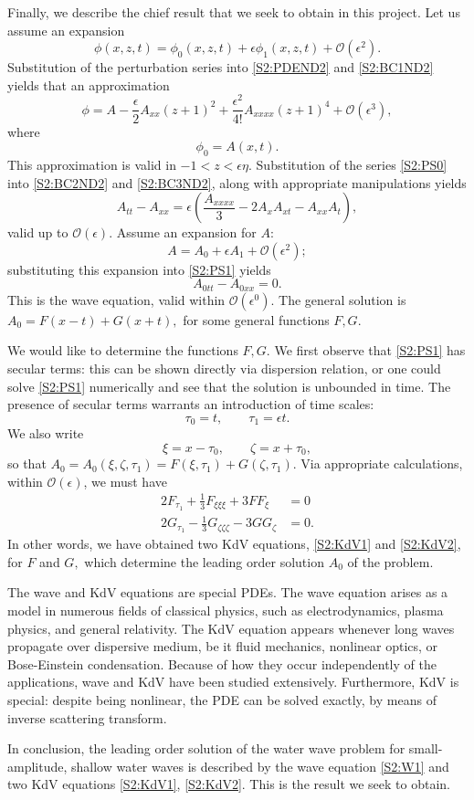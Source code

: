 Finally, we describe the chief result that we seek to obtain in this project. Let us assume an expansion
\[ \phi(x,z,t) = \phi_0(x,z,t) + \epsilon \phi_1(x,z,t) + \mathcal{O}(\epsilon^2).\]
Substitution of the perturbation series into \eqref{S2:PDEND2} and \eqref{S2:BC1ND2} yields that an approximation
\begin{equation}\label{S2:PS0}
\phi = A - \frac{\epsilon}{2} A_{xx}(z+1)^2 + \frac{\epsilon^2}{4!} A_{xxxx} (z+1)^4 + \mathcal{O}(\epsilon^3),
\end{equation}
where
\[ \phi_0 = A(x,t).\]
This approximation is valid in $-1<z<\epsilon \eta.$ Substitution of the series \eqref{S2:PS0} into \eqref{S2:BC2ND2} and \eqref{S2:BC3ND2}, along with appropriate manipulations yields
\begin{equation}\label{S2:PS1}
A_{tt} - A_{xx} = \epsilon\left( \frac{A_{xxxx}}{3} - 2A_x A_{xt} - A_{xx}A_t\right),
\end{equation}
valid up to $\mathcal{O}(\epsilon).$ Assume an expansion for $A:$ 
\[ A = A_0 + \epsilon A_1 + \mathcal{O}(\epsilon^2);\]
substituting this expansion into \eqref{S2:PS1} yields
\begin{equation}\label{S2:W1}
 A_{0tt} - A_{0xx} = 0.
\end{equation}
This is the wave equation, valid within $\mathcal{O}(\epsilon^0).$ The general solution is $A_0 = F(x-t) + G(x+t),$ for some general functions $F,G.$

We would like to determine the functions $F,G.$ We first observe that \eqref{S2:PS1} has secular terms: this can be shown directly via dispersion relation, or one could solve \eqref{S2:PS1} numerically and see that the solution is unbounded in time. The presence of secular terms warrants an introduction of time scales:
\[ \tau_0 = t, \qquad \tau_1 = \epsilon t.\]
We also write 
\[ 
\xi = x- \tau_0, \qquad \zeta = x + \tau_0,
\]
so that $A_0 = A_0(\xi, \zeta, \tau_1) = F(\xi, \tau_1) + G(\zeta, \tau_1).$ Via appropriate calculations, within $\mathcal{O}(\epsilon)$, we must have 
\begin{align}
2F_{\tau_1} + \frac{1}{3}F_{\xi\xi\xi} + 3 F F_\xi &= 0 \label{S2:KdV1} \\
2G_{\tau_1} - \frac{1}{3}G_{\zeta\zeta\zeta} -  3 G G_\zeta &= 0. \label{S2:KdV2}
\end{align}
In other words, we have obtained two KdV equations, \eqref{S2:KdV1} and \eqref{S2:KdV2}, for $F$ and $G,$ which determine the leading order solution $A_0$ of the problem. 

The wave and KdV equations are special PDEs. The wave equation arises as a model in numerous fields of classical physics, such as electrodynamics, plasma physics, and general relativity. The KdV equation appears whenever long waves propagate over dispersive medium, be it fluid mechanics, nonlinear optics, or Bose-Einstein condensation. Because of how they occur independently of the applications, wave and KdV have been studied extensively. Furthermore, KdV is special: despite being nonlinear, the PDE can be solved exactly, by means of inverse scattering transform. 

In conclusion, the leading order solution of the water wave problem for small-amplitude, shallow water waves is described by the wave equation \eqref{S2:W1} and two KdV equations \eqref{S2:KdV1}, \eqref{S2:KdV2}. This is the result we seek to obtain. 